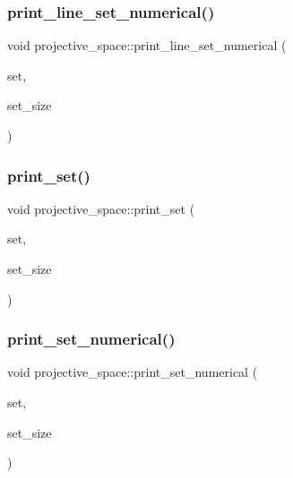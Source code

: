 \subsubsection{\texorpdfstring{print\+\_\+line\+\_\+set\+\_\+numerical()}{print\_line\_set\_numerical()}}
{\footnotesize\ttfamily void projective\+\_\+space\+::print\+\_\+line\+\_\+set\+\_\+numerical (\begin{DoxyParamCaption}\item[{\mbox{\hyperlink{galois_8h_a09fddde158a3a20bd2dcadb609de11dc}{I\+NT}} $\ast$}]{set,  }\item[{\mbox{\hyperlink{galois_8h_a09fddde158a3a20bd2dcadb609de11dc}{I\+NT}}}]{set\+\_\+size }\end{DoxyParamCaption})}

\mbox{\label{classprojective__space_aebfbb6d02bd979dc902c65a1d826b7f8}} 
\subsubsection{\texorpdfstring{print\+\_\+set()}{print\_set()}}
{\footnotesize\ttfamily void projective\+\_\+space\+::print\+\_\+set (\begin{DoxyParamCaption}\item[{\mbox{\hyperlink{galois_8h_a09fddde158a3a20bd2dcadb609de11dc}{I\+NT}} $\ast$}]{set,  }\item[{\mbox{\hyperlink{galois_8h_a09fddde158a3a20bd2dcadb609de11dc}{I\+NT}}}]{set\+\_\+size }\end{DoxyParamCaption})}

\mbox{\label{classprojective__space_ac6ee25b30e3fbe635750d0f0924e0bba}} 
\subsubsection{\texorpdfstring{print\+\_\+set\+\_\+numerical()}{print\_set\_numerical()}}
{\footnotesize\ttfamily void projective\+\_\+space\+::print\+\_\+set\+\_\+numerical (\begin{DoxyParamCaption}\item[{\mbox{\hyperlink{galois_8h_a09fddde158a3a20bd2dcadb609de11dc}{I\+NT}} $\ast$}]{set,  }\item[{\mbox{\hyperlink{galois_8h_a09fddde158a3a20bd2dcadb609de11dc}{I\+NT}}}]{set\+\_\+size }\end{DoxyParamCaption})}

